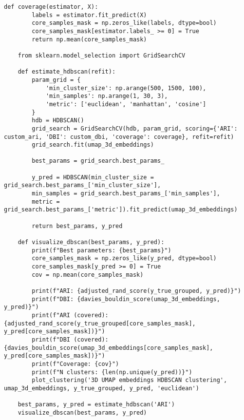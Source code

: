 \begin{lstlisting}[label=lst:1,caption=Кластеризация респондентов социологического исследования]
	def coverage(estimator, X):
		labels = estimator.fit_predict(X)
		core_samples_mask = np.zeros_like(labels, dtype=bool)
		core_samples_mask[estimator.labels_ >= 0] = True
		return np.mean(core_samples_mask)
	
	from sklearn.model_selection import GridSearchCV
	
	def estimate_hdbscan(refit):
		param_grid = {
			'min_cluster_size': np.arange(500, 1500, 100),
			'min_samples': np.arange(1, 30, 3),
			'metric': ['euclidean', 'manhattan', 'cosine']
		}
		hdb = HDBSCAN()
		grid_search = GridSearchCV(hdb, param_grid, scoring={'ARI': custom_ari, 'DBI': custom_dbi, 'coverage': coverage}, refit=refit)
		grid_search.fit(umap_3d_embeddings)
		
		best_params = grid_search.best_params_
		
		y_pred = HDBSCAN(min_cluster_size = grid_search.best_params_['min_cluster_size'],
		min_samples = grid_search.best_params_['min_samples'],
		metric = grid_search.best_params_['metric']).fit_predict(umap_3d_embeddings)
		
		return best_params, y_pred
	
	def visualize_dbscan(best_params, y_pred):
		print(f"Best parameters: {best_params}")
		core_samples_mask = np.zeros_like(y_pred, dtype=bool)
		core_samples_mask[y_pred >= 0] = True
		cov = np.mean(core_samples_mask)
		
		print(f"ARI: {adjusted_rand_score(y_true_grouped, y_pred)}")
		print(f"DBI: {davies_bouldin_score(umap_3d_embeddings, y_pred)}")
		print(f"ARI (covered): {adjusted_rand_score(y_true_grouped[core_samples_mask], y_pred[core_samples_mask])}")
		print(f"DBI (covered): {davies_bouldin_score(umap_3d_embeddings[core_samples_mask], y_pred[core_samples_mask])}")
		print(f"Coverage: {cov}")
		print(f"N clusters: {len(np.unique(y_pred))}")
		plot_clustering('3D UMAP embeddings HDBSCAN clustering', umap_3d_embeddings, y_true_grouped, y_pred, 'euclidean')
	
	best_params, y_pred = estimate_hdbscan('ARI')
	visualize_dbscan(best_params, y_pred)
\end{lstlisting}

\clearpage
